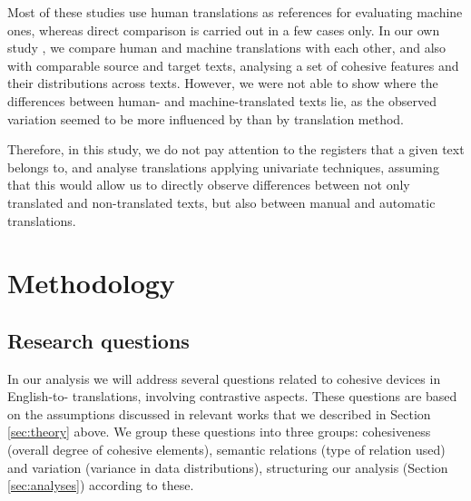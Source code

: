 \documentclass[output=paper]{langsci/langscibook.cls}
\begin{document}
Most of these studies use human translations as references for evaluating machine ones, whereas direct comparison is carried out in a few cases only. In our own study \citep{Lapshinova2015Disco}, we compare human and machine translations with each other, and also with comparable source and target texts, analysing a set of cohesive features and their distributions across texts. However, we were not able to show where the differences between human- and machine-translated texts lie, as the observed variation seemed to be more influenced by  than by translation method.

Therefore, in this study, we do not pay attention to the registers that a given text belongs to, and analyse translations applying univariate techniques, assuming that this would allow us to directly observe differences between not only translated and non-translated texts, but also between manual and automatic translations.


\largerpage[1]
\section{Methodology}\label{sec:methodology}
\subsection{Research questions}\label{sec:researchquestions}
In our analysis we will address several questions related to cohesive devices in English-to- translations, involving contrastive aspects. These questions are based on the assumptions discussed in relevant works that we described in Section \ref{sec:theory} above. We group these questions into three groups: cohesiveness (overall degree of cohesive elements), semantic relations (type of relation used) and variation (variance in data distributions), structuring our analysis (Section \ref{sec:analyses}) according to these. 
\end{document}
